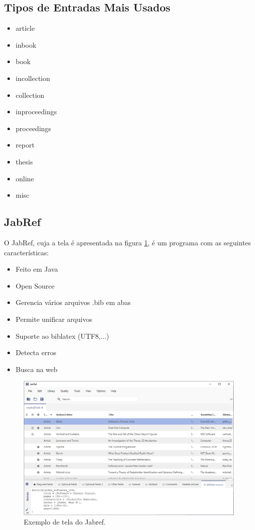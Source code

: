 \subsection{Tipos de Entradas Mais Usados}
\begin{itemize}
    \item article
    \item inbook
    \item book
    \item incollection
    \item collection
    \item inproceedings
    \item proceedings
    \item report
    \item thesis
    \item online
    \item misc
\end{itemize}



\subsection{JabRef}
O JabRef, cuja a tela é apresentada na figura \ref{fig:jabref},  é um programa com as seguintes características:
\begin{itemize}
    \item Feito em Java
    \item Open Source
    \item Gerencia vários arquivos .bib em abas
    \item Permite unificar arquivos
    \item Suporte ao biblatex (UTF8,...)
    \item Detecta erros
    \item Busca na web
\end{itemize}


\begin{figure}
    \centering
    \includegraphics[width=0.7\linewidth]{Images/jabref}
    \caption{Exemplo de tela do Jabref.}
    \label{fig:jabref}
\end{figure}  







